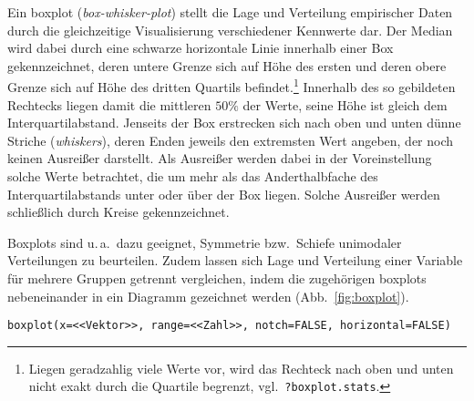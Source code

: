 Ein boxplot (\emph{box-whisker-plot}) stellt die Lage und Verteilung empirischer Daten durch die gleichzeitige Visualisierung verschiedener Kennwerte dar. Der Median wird dabei durch eine schwarze horizontale Linie innerhalb einer Box gekennzeichnet, deren untere Grenze sich auf Höhe des ersten und deren obere Grenze sich auf Höhe des dritten Quartils befindet.\footnote{Liegen geradzahlig viele Werte vor, wird das Rechteck nach oben und unten nicht exakt durch die Quartile begrenzt, vgl.\ \lstinline!?boxplot.stats!.} Innerhalb des so gebildeten Rechtecks liegen damit die mittleren $50\%$ der Werte, seine Höhe ist gleich dem Interquartilabstand. Jenseits der Box erstrecken sich nach oben und unten dünne Striche (\emph{whiskers}), deren Enden jeweils den extremsten Wert angeben, der noch keinen Ausreißer darstellt. Als Ausreißer werden dabei in der Voreinstellung solche Werte betrachtet, die um mehr als das Anderthalbfache des Interquartilabstands unter oder über der Box liegen. Solche Ausreißer werden schließlich durch Kreise gekennzeichnet.

Boxplots sind u.\,a.\ dazu geeignet, Symmetrie bzw.\ Schiefe unimodaler Verteilungen zu beurteilen. Zudem lassen sich Lage und Verteilung einer Variable für mehrere Gruppen getrennt vergleichen, indem die zugehörigen boxplots nebeneinander in ein Diagramm gezeichnet werden (Abb.\ \ref{fig:boxplot}).
\begin{lstlisting}
boxplot(x=<<Vektor>>, range=<<Zahl>>, notch=FALSE, horizontal=FALSE)
\end{lstlisting}

